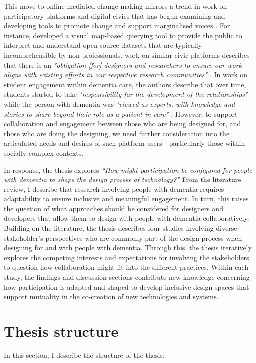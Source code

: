 This move to online-mediated change-making mirrors a trend in work on participatory platforms and digital civics that has begun examining and developing tools to promote change and support marginalised voices \citep{corbett_exploring_2018}. For instance, \cite{puussaar_making_2018} developed a visual map-based querying tool to provide the public to interpret and understand open-source datasets that are typically incomprehensible by non-professionals. \cite{asad_tap_2017} work on similar civic platforms describes that there is an \textit{"obligation [for] designers and researchers to ensure our work aligns with existing efforts in our respective research communities" \citep[pg. 6314]{asad_tap_2017}}. In \cite{foley_student_2020} work on student engagement within dementia care, the authors describe that over time, students started to take \textit{"responsibility for the development of the relationships"} while the person with dementia was \textit{"viewed as experts, with knowledge and stories to share beyond their role as a patient in care" \citep[pg. 9]{foley_student_2020}}. However, to support collaboration and engagement between those who are being designed for, and those who are doing the designing, we need further consideration into the articulated needs and desires of such platform users - particularly those within socially complex contexts. 

In response, the thesis explores \textit{``How might participation be configured for people with dementia to shape the design process of technology?''} From the literature review, I describe that research involving people with dementia requires adaptability to ensure inclusive and meaningful engagement. In turn, this raises the question of what approaches should be considered for designers and developers that allow them to design with people with dementia collaboratively. Building on the literature, the thesis describes four studies involving diverse stakeholder's perspectives who are commonly part of the design process when designing for and with people with dementia. Through this, the thesis iteratively explores the competing interests and expectations for involving the stakeholders to question how collaboration might fit into the different practices. Within each study, the findings and discussion sections contribute new knowledge concerning how participation is adapted and shaped to develop inclusive design spaces that support mutuality in the co-creation of new technologies and systems.

\section{Thesis structure}
\label{Intro: Thesis structure}
In this section, I describe the structure of the thesis:

